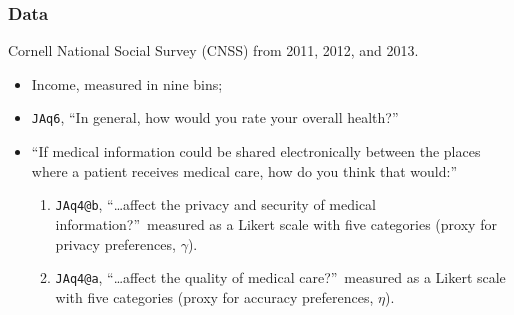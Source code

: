 \begin{frame}[allowframebreaks]%
\frametitle{Data}
Cornell National Social Survey (CNSS) from 2011, 2012,
and 2013.
\begin{itemize}
\item Income, measured in nine bins;

\item \texttt{JAq6}, \textquotedblleft In general, how would you rate your
overall health?\textquotedblright\

\item \textquotedblleft If medical information could be shared
electronically between the places where a patient receives medical care, how
do you think that would:\textquotedblright\

\begin{enumerate}
\item \texttt{JAq4@b}, \textquotedblleft \ldots affect the privacy and
security of medical information?\textquotedblright\ measured as a Likert
scale with five categories (proxy for privacy preferences, $\gamma $).

\item \texttt{JAq4@a}, \textquotedblleft \ldots affect the quality of
medical care?\textquotedblright\ measured as a Likert scale with five
categories (proxy for accuracy preferences, $\eta $).
\end{enumerate}

\end{itemize}

\end{frame}%
%

